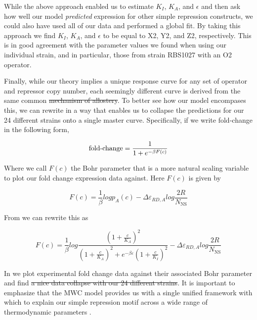 While the above approach enabled us to estimate $K_I$, $K_A$, and $\epsilon$ and
then ask how well our model \textit{predicted} expression for other simple
repression constructs, we could also have used all of our data and performed a
global fit. By taking this approach we find $K_I$, $K_A$, and $\epsilon$ to be
equal to X2, Y2, and Z2, respectively. This is in good agreement with the
parameter values we found when using our individual strain, and in particular,
those from strain RBS1027 with an O2 operator.

 Finally, while our theory implies a unique
response curve for any set of operator and repressor copy number, each seemingly
different curve is derived from the same  common  \sout{mechanism of allostery}. To
better see how our model encompases this, we can rewrite \eref[eq7] in a way
that enables us to collapse the predictions for our 24 different strains onto a
single master curve. Specifically, if we write fold-change in the following
form,

\begin{equation}\label{eq8}
\operatorname{fold-change}= \frac{1}{1+e^{-\beta F(c)}}
\end{equation}

Where  we call $F(c)$ the Bohr parameter \cite{Phillips2016} that is a more natural scaling variable to plot our fold change expression data against. Here $F(c)$ is given by 

\begin{equation}\label{eq9}
F(c) =  \frac{1}{\beta} log p_A(c)
- \Delta\varepsilon_{RD,A}
log \frac{2R}{N_{\text{NS}}}
\end{equation}

From \eref[eq6v2] we can rewrite this as

\begin{equation}\label{eq10}
F(c) = \frac{1}{\beta} log \frac{\left(1+\frac{c}{K_A}\right)^2}{\left(1+\frac{c}{K_A}\right)^2+e^{-\beta  \varepsilon }\left(1+\frac{c}{K_I}\right)^2} - \Delta\varepsilon_{RD,A} log \frac{2R}{N_{\text{NS}}}
\end{equation}

In  we plot experimental fold change data against their
associated Bohr parameter and find  \sout{a nice data collapse with our 24 different
strains}. It is important to emphasize that the MWC model provides us with a
single unified framework with which to explain our simple repression motif
across a wide range of thermodynamic parameters .

